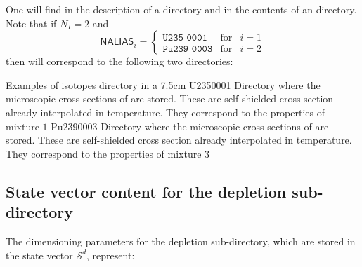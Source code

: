 One will find in  the description of a 
 directory and in 
 the contents of an  directory. Note that if $N_{I}=2$ and 
\begin{displaymath}
\mathsf{NALIAS}_{i} = \left\{
\begin{array}{lll}
\texttt{U235    0001} & \textrm{for}& i=1\\
\texttt{Pu239   0003} & \textrm{for}& i=2
\end{array} \right.
\end{displaymath}
then  will correspond to the following two directories:

\begin{DescriptionEnregistrement}{Examples of isotopes directory in a }{7.5cm}
\DirEnr
  {U2350001}
  {Directory where the microscopic cross sections of  are stored. These are 
   self-shielded cross section already interpolated in temperature. They correspond to the
  properties of mixture $1$}
\DirEnr
  {Pu2390003}
  {Directory where the microscopic cross sections of  are stored. These are 
   self-shielded cross section already interpolated in temperature. They correspond to the
  properties of mixture $3$}
\end{DescriptionEnregistrement}

\subsection{State vector content for the depletion sub-directory}\label{sect:chainlibstate}

The dimensioning parameters for the depletion sub-directory, which are stored in
the state vector $\mathcal{S}^{d}$, represent:

